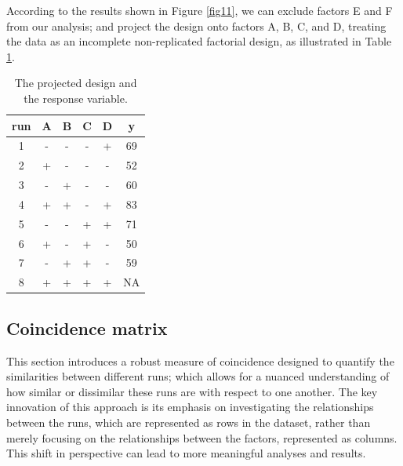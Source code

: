 \documentclass[twoside]{article}
\begin{document}
According to the results shown in Figure \ref{fig11}, we can exclude factors E and F from our analysis; and project the design onto factors A, B, C, and D, treating the data as an incomplete non-replicated factorial design, as illustrated in Table \ref{tab2}.

 \begin{table}[h]
\begin{center}
\small
\caption{The projected design and the response variable.}\label{tab2}
\begin{tabular}{c|cccc|c}
  \hline
  run & A & B & C& D & y \\
  \hline
 1& - &- & -& +&69\\
2& +& -& - &-&52\\
3& - &+& -& - & 60\\
4& +&+& -&+&83\\
5&-&-& +& + &71\\
6&+&-& +& -&50\\
7&-&+& +&-&59\\
8&+&+& +&+& NA\\  \hline
\end{tabular}
\end{center}
\end{table}
\subsection{Coincidence matrix}
This section introduces a robust measure of coincidence designed to quantify the similarities between different runs; which allows for a nuanced understanding of how similar or dissimilar these runs are with respect to one another. The key innovation of this approach is its emphasis on investigating the relationships between the runs, which are represented as rows in the dataset, rather than merely focusing on the relationships between the factors, represented as columns. This shift in perspective can lead to more meaningful analyses and results.%
\end{document}
